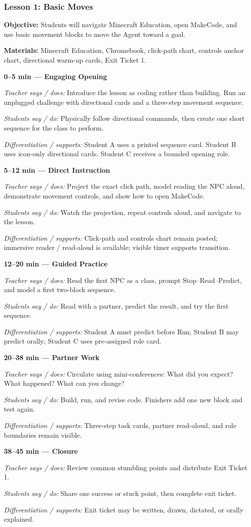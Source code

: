 \documentclass[12pt]{article}
\newcommand{\lessonphase}[5]{%
\noindent\textbf{\color{brickRed}#1 --- #2}\par
\textit{Teacher says / does:} #3\par
\textit{Students say / do:} #4\par
\textit{Differentiation / supports:} #5\par\medskip
}
\begin{document}
\subsubsection*{Lesson 1: Basic Moves}
\textbf{Objective:} Students will navigate Minecraft Education, open MakeCode, and use basic movement blocks to move the Agent toward a goal.\par
\textbf{Materials:} Minecraft Education, Chromebook, click-path chart, controls anchor chart, directional warm-up cards, Exit Ticket 1.\par
\begin{designbox}
\lessonphase{0--5 min}{Engaging Opening}{Introduce the lesson as coding rather than building. Run an unplugged challenge with directional cards and a three-step movement sequence.}{Physically follow directional commands, then create one short sequence for the class to perform.}{Student A uses a printed sequence card. Student B uses icon-only directional cards. Student C receives a bounded opening role.}
\lessonphase{5--12 min}{Direct Instruction}{Project the exact click path, model reading the NPC aloud, demonstrate movement controls, and show how to open MakeCode.}{Watch the projection, repeat controls aloud, and navigate to the lesson.}{Click-path and controls chart remain posted; immersive reader / read-aloud is available; visible timer supports transition.}
\lessonphase{12--20 min}{Guided Practice}{Read the first NPC as a class, prompt Stop--Read--Predict, and model a first two-block sequence.}{Read with a partner, predict the result, and try the first sequence.}{Student A must predict before Run; Student B may predict orally; Student C uses pre-assigned role card.}
\lessonphase{20--38 min}{Partner Work}{Circulate using mini-conferences: What did you expect? What happened? What can you change?}{Build, run, and revise code. Finishers add one new block and test again.}{Three-step task cards, partner read-aloud, and role boundaries remain visible.}
\lessonphase{38--45 min}{Closure}{Review common stumbling points and distribute Exit Ticket 1.}{Share one success or stuck point, then complete exit ticket.}{Exit ticket may be written, drawn, dictated, or orally explained.}
\end{designbox}
\end{document}
